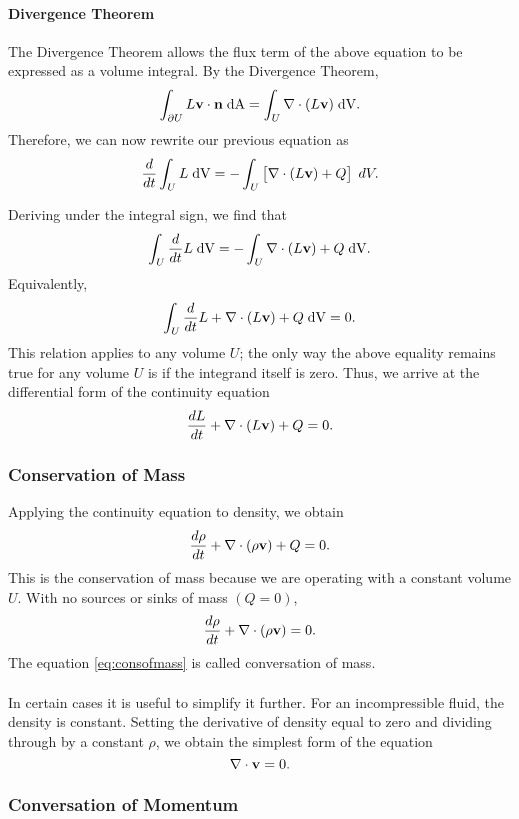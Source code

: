 \paragraph{Divergence Theorem}

The Divergence Theorem allows the flux term of the above equation to be expressed as a volume integral. By the Divergence Theorem,
\[\displaystyle\int_{\partial U} L \mathbf{ v}\cdot\mathbf{ n}\;\mathrm{dA} = \displaystyle\int_{ U} \nabla\cdot(L\mathbf{ v})\;\mathrm{dV}.\]
Therefore, we can now rewrite our previous equation as 
\[\dfrac{d}{dt}\displaystyle\int_ U L \;\mathrm{dV} = - \displaystyle\int_{ U}\left[ \nabla\cdot(L\mathbf{ v}) + Q\right]\; dV.\]


Deriving under the integral sign, we find that
\[\displaystyle\int_ U \dfrac{d}{dt}L \;\mathrm{dV} = - \displaystyle\int_{ U} \nabla\cdot(L\mathbf{ v}) + Q\; \mathrm{dV}.\]
Equivalently, 
\[\displaystyle\int_ U \dfrac{d}{dt}L +  \nabla\cdot(L \mathbf{ v}) + Q\;\mathrm{dV} = 0.\]
This relation applies to any volume $ U$; the only way the above equality remains true for any volume $U$ is if the integrand itself is zero. Thus, we arrive at the differential form of the continuity equation
\[\dfrac{dL}{dt} + \nabla\cdot(L\mathbf{ v}) + Q = 0.\]

\subsubsection*{Conservation of Mass}

Applying the continuity equation to density, we obtain
\[\dfrac{d\rho}{dt} + \nabla\cdot(\rho\mathbf{ v}) + Q = 0.\]
This is the  conservation of mass because we are operating with a constant  volume $ U$. With no sources or sinks of mass $(Q=0)$,
\begin{equation}
\dfrac{d\rho}{dt} + \nabla\cdot(\rho\mathbf{ v}) = 0. \label{eq:consofmass}
\end{equation}
The equation \ref{eq:consofmass}  is called   conversation of mass.\\\\


In certain cases it is useful to simplify it further. For an incompressible fluid, the density is constant. Setting the derivative of density equal to zero and dividing through by a constant $\rho$, we obtain the simplest form of the equation
\[\nabla\cdot\mathbf{ v} = 0.\]


\subsubsection*{Conversation of Momentum}

